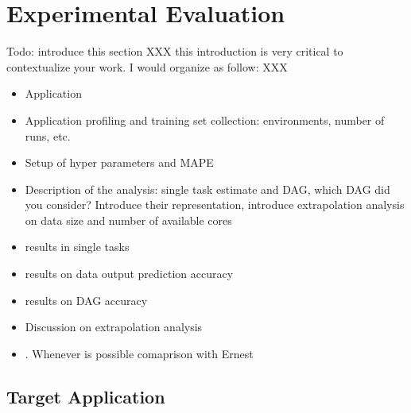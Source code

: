 \documentclass[a4paper, 10pt, conference]{ieeeconf}      %
\begin{document}









\section{Experimental Evaluation}
\label{section:evaluation}
Todo: introduce this section
XXX this introduction is very critical to contextualize your work.  I would organize as follow:  XXX


\begin{itemize}
\item Application 
\item Application profiling and training set collection:  environments, number of runs, etc.
\item Setup of hyper parameters and MAPE
\item Description of the analysis:  single task estimate and DAG, which DAG did you consider?  Introduce their representation, introduce extrapolation analysis on data size and number of available cores 
\item results in single tasks
\item results on data output prediction accuracy
\item results on DAG accuracy
\item Discussion on extrapolation analysis
\item. Whenever is possible comaprison with Ernest 
\end{itemize}
\subsection{Target Application}
\end{document}
